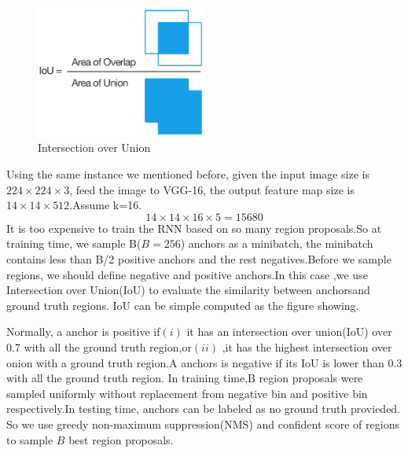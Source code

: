 \documentclass[12pt,a4paper]{report}
\begin{document}
\begin{figure}[h]
\centering
\includegraphics[width=0.5\textwidth]{iou.png}
\caption{Intersection over Union}
\end{figure}
Using the same instance we mentioned before, given the input image size is $224\times 224 \times 3$, feed the image to VGG-16, the output feature map size is $14\times 14\times 512$.Assume k=16.\[14\times 14\times 16\times 5=15680\] It is too expensive to train the RNN based on so many region proposals.So at training time, we sample B($B=256$) anchors as a minibatch, the minibatch contains less than B/2 positive anchors and the rest negatives.Before we sample regions, we should define negative and positive anchors.In this case ,we use Intersection over Union(IoU) to evaluate the similarity between anchorsand ground truth regions. IoU can be simple computed as the figure showing.

 Normally, a anchor is positive if$(i)$ it has an intersection over union(IoU) over 0.7 with all the ground truth region,or$(ii)$ ,it has the highest intersection over onion with a ground truth region.A anchors is negative if its IoU is lower than 0.3 with all the ground truth region. In training time,B region proposals were sampled uniformly  without replacement from negative bin and positive bin respectively.In testing time, anchors can be labeled as no ground truth provieded. So we use greedy non-maximum suppression(NMS) and confident score of regions to sample $B$ best region proposals.
 
\end{document}
